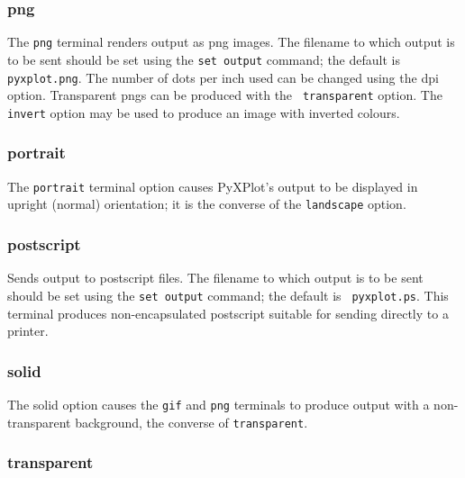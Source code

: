 \subsubsection{png}

The {\tt png} terminal renders output as png images. The filename to which
output is to be sent should be set using the {\tt set output} command; the
default is {\tt pyxplot.png}. The number of dots per inch used can be changed
using the dpi option. Transparent pngs can be produced with the {\tt
transparent} option. The {\tt invert} option may be used to produce an image
with inverted colours.


\subsubsection{portrait}

The {\tt portrait} terminal option causes PyXPlot's output to be displayed in
upright (normal) orientation; it is the converse of the {\tt landscape} option.


\subsubsection{postscript}

Sends output to postscript files. The filename to which output is to be sent
should be set using the {\tt set output} command; the default is {\tt
pyxplot.ps}.  This terminal produces non-encapsulated postscript suitable for
sending directly to a printer.


\subsubsection{solid}

The solid option causes the {\tt gif} and {\tt png} terminals to produce output
with a non-transparent background, the converse of {\tt transparent}.


\subsubsection{transparent}

